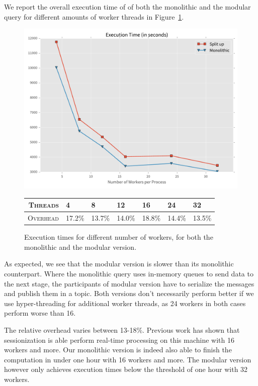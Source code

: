 We report the overall execution time of of both the monolithic and the 
modular query for different amounts of worker threads in Figure~\ref{fig:times}.

\begin{figure}[htb]
  \centering
    \includegraphics[width=1\textwidth]{figures/evaluation/times}

    {\footnotesize
    \vspace{1em}
    \begin{tabularx}{\textwidth}{ rXXXXXX }
      \hline 
      \textsc{Threads} & 4 & 8 & 12 & 16 & 24 & 32 \\
      \hline 
      \textsc{Overhead} & 17.2\%&13.7\%&14.0\%&18.8\%&14.4\%&13.5\% \\
      \hline
    \end{tabularx}
    }
    \caption[Execution times for different number of workers]{
    Execution times for different number of workers, for both the monolithic
    and the modular version.}
    \label{fig:times}
\end{figure}

As expected, we see that the modular version is slower than its monolithic
counterpart. Where the monolithic query uses in-memory queues to send data
to the next stage, the participants of modular version have to serialize
the messages and publish them in a topic. Both versions don't necessarily
perform better if we use hyper-threading for additional worker threads,
as 24 workers in both cases perform worse than 16.

The relative overhead varies between 13-18\%. Previous work has shown that
sessionization is able perform real-time processing on this machine with
16 workers and more. Our monolithic version is indeed also able to finish
the computation in under one hour with 16 workers and more. The modular version
however only achieves execution times below the threshold of one hour with
32 workers.

